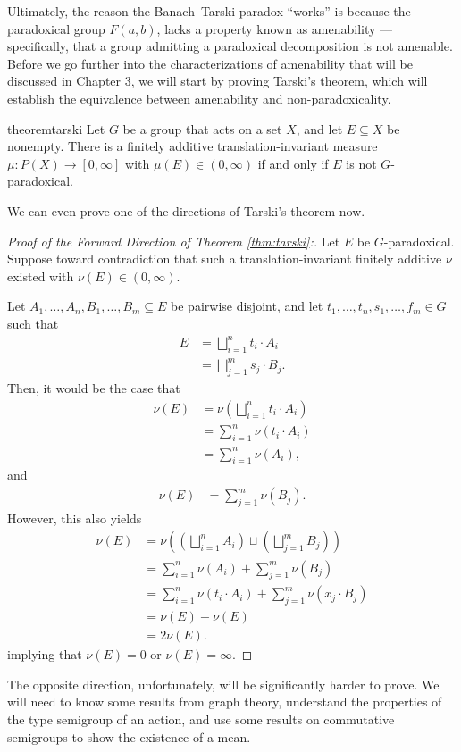 Ultimately, the reason the Banach--Tarski paradox ``works'' is because the paradoxical group $F(a,b)$, lacks a property known as amenability --- specifically, that a group admitting a paradoxical decomposition is not amenable. Before we go further into the characterizations of amenability that will be discussed in Chapter 3, we will start by proving Tarski's theorem, which will establish the equivalence between amenability and non-paradoxicality.
\begin{restatable}{theorem}{tarski}
  Let $G$ be a group that acts on a set $X$, and let $E \subseteq X$ be nonempty. 
  There is a finitely additive translation-invariant measure 
  $\mu \colon P(X) \to [0, \infty]$ with $\mu(E) \in (0, \infty)$ 
  if and only if $E$ is not $G$-paradoxical.
\label{thm:tarski}
\end{restatable}
We can even prove one of the directions of Tarski's theorem now.
\begin{proof}[Proof of the Forward Direction of Theorem \ref{thm:tarski}:]
  Let $E$ be $G$-paradoxical. Suppose toward contradiction that such a translation-invariant finitely additive $\nu$ existed with $\nu(E) \in (0,\infty)$.\newline

  Let $A_1,\dots,A_n,B_1,\dots,B_m\subseteq E$ be pairwise disjoint, and let $t_1,\dots,t_n,s_1,\dots,f_m\in G$ such that
  \begin{align*}
    E &= \bigsqcup_{i=1}^{n}t_i\cdot A_i\\
      &= \bigsqcup_{j=1}^{m}s_j\cdot B_j.
  \end{align*}
  Then, it would be the case that
  \begin{align*}
    \nu(E) &= \nu\left(\bigsqcup_{i=1}^{n}t_i\cdot A_i\right)\\
           &= \sum_{i=1}^{n}\nu\left(t_i\cdot A_i\right)\\
           &= \sum_{i=1}^{n}\nu\left(A_i\right),
  \end{align*}
  and
  \begin{align*}
    \nu(E) &= \sum_{j=1}^{m}\nu\left(B_j\right).
  \end{align*}
  However, this also yields
  \begin{align*}
    \nu\left(E\right) &= \nu\left(\left(\bigsqcup_{i=1}^{n}A_i\right)\sqcup \left(\bigsqcup_{j=1}^{m}B_j\right)\right)\\
                      &= \sum_{i=1}^{n}\nu\left(A_i\right) + \sum_{j=1}^{m}\nu\left(B_j\right)\\
                      &= \sum_{i=1}^{n}\nu\left(t_i\cdot A_i\right) + \sum_{j=1}^{m}\nu\left(x_j\cdot B_j\right)\\
                      &= \nu\left(E\right) + \nu\left(E\right)\\
                      &= 2\nu\left(E\right).
  \end{align*}
  implying that $\nu(E) = 0$ or $\nu(E) = \infty$.
\end{proof}
The opposite direction, unfortunately, will be significantly harder to prove. We will need to know some results from graph theory, understand the properties of the type semigroup of an action, and use some results on commutative semigroups to show the existence of a mean.
